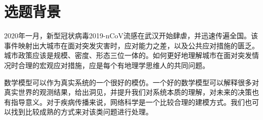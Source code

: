 \chapter{选题背景}

2020年一月，新型冠状病毒2019-nCoV流感在武汉开始肆虐，并迅速传遍全国。该事件映射出大城市在面对突发灾害时，应对能力之差，以及公共应对措施的匮乏。城市政策应该是规模、密度、形态三位一体的\cite{xiu_2003}。如何更好地理解城市在面对突发情况时合理的宏观应对措施，应是每个有地理学思维人的共同问题。

数学模型可以作为真实系统的一个很好的模仿。一个好的数学模型可以解释很多对真实世界的观测结果，给出洞见，并提升我们对系统本质的理解，对未来的决策也有指导意义。对于疾病传播来说，网络科学是一个比较合理的建模方式。我们也可以找到比较成熟的方式来对该类问题进行处理\cite{kiss2017mathematics}。